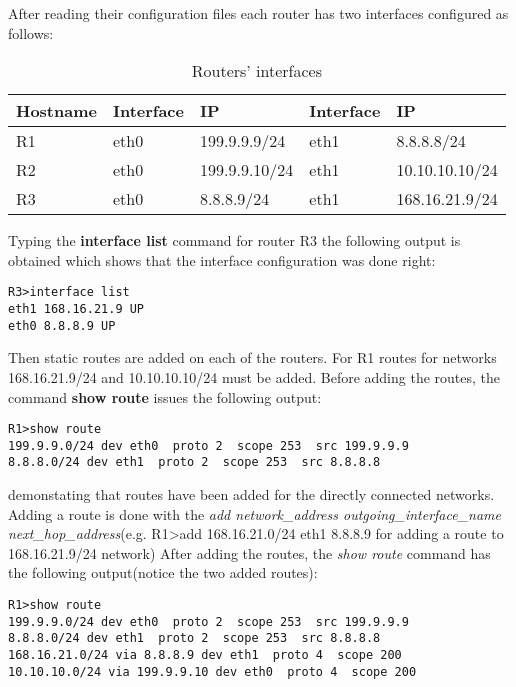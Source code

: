 {{After reading their configuration files each router has two interfaces configured as follows:
\begin{center}
  \begin{table}[htb]
  \begin{center}
  \begin{tabular}{| l | l | l | l | l |}
    \hline
      Hostname & Interface & IP & Interface & IP \\ \hline
      R1 & eth0 & 199.9.9.9/24 & eth1 & 8.8.8.8/24 \\ \hline
      R2 & eth0 & 199.9.9.10/24 & eth1 & 10.10.10.10/24\\ \hline
      R3 & eth0 & 8.8.8.9/24 & eth1 & 168.16.21.9/24 \\
    \hline
  \end{tabular}
  \end{center}
  \caption{Routers' interfaces}
  \label{table:tdevices}
  \end{table}
\end{center}
Typing the \textbf{interface list} command for router R3 the following output is obtained which shows that the interface configuration was done right:
\lstset{language=TeX, caption=Router R3 interfaces}
\begin{lstlisting}
R3>interface list  
eth1 168.16.21.9 UP
eth0 8.8.8.9 UP
\end{lstlisting}

Then static routes are added on each of the routers.
For R1 routes for networks 168.16.21.9/24 and 10.10.10.10/24 must be added.
Before adding the routes, the command \textbf{show route} issues the following output:
\lstset{language=TeX, caption=Directly connected routes}
\begin{lstlisting}
R1>show route  
199.9.9.0/24 dev eth0  proto 2  scope 253  src 199.9.9.9 
8.8.8.0/24 dev eth1  proto 2  scope 253  src 8.8.8.8 
\end{lstlisting}
demonstating that routes have been added for the directly connected networks.
Adding a route is done with the \textit{add network_address outgoing_interface_name next_hop_address}(e.g. R1>add 168.16.21.0/24 eth1 8.8.8.9 for adding a route to 168.16.21.9/24 network)
After adding the routes, the \textit{show route} command has the following output(notice the two added routes):
\lstset{language=TeX, caption=R1 routing table}
\begin{lstlisting}
R1>show route  
199.9.9.0/24 dev eth0  proto 2  scope 253  src 199.9.9.9 
8.8.8.0/24 dev eth1  proto 2  scope 253  src 8.8.8.8 
168.16.21.0/24 via 8.8.8.9 dev eth1  proto 4  scope 200
10.10.10.0/24 via 199.9.9.10 dev eth0  proto 4  scope 200
\end{lstlisting}

}}
